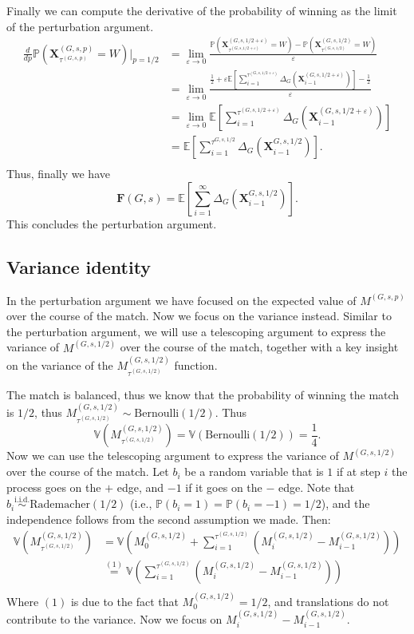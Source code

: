 \documentclass{article}
\newcommand{\var}{\mathbb{V}}
\newcommand{\win}{W}
\newcommand{\x}{\mathbf{X}}
\newcommand{\xgp}{\x^{\left(G, s, p\right)}}
\newcommand{\xge}{\x^{\left(G, s, 1/2 + \varepsilon\right)}}
\newcommand{\xghalf}{\x^{\left(G, s, 1/2\right)}}
\newcommand{\taugp}{{\tau^{\left(G, s, p\right)}}}
\newcommand{\taughalf}{{\tau^{\left(G, s, 1/2\right)}}}
\newcommand{\tauge}{{\tau^{\left(G, s, 1/2 + \varepsilon\right)}}}
\newcommand{\mgp}{\m^{\left(G, s, p\right)}}
\newcommand{\mghalf}{\m^{\left(G, s, 1/2\right)}}
\newcommand{\m}{M}
\newcommand{\ex}{\mathbb{E}}
\newcommand{\pr}{\mathbb{P}}
\newcommand{\fair}{\mathbf{F}}
\begin{document}
Finally we can compute the derivative of the probability of winning as the limit of the perturbation argument.
\begin{align*}
    \frac{d}{dp} \pr\left(\xgp_\taugp = \win\right)  \Big\vert_{p=1/2} &= \lim_{\varepsilon \to 0} \frac{\pr\left(\xge_\tauge = \win\right) - \pr\left(\xghalf_\taughalf = \win\right)}{\varepsilon} \\
    &= \lim_{\varepsilon \to 0} \frac{\frac12 + \varepsilon \ex\left[\sum_{i=1}^{\tauge} \Delta_G\left(\xge_{i-1}\right)\right] - \frac12}{\varepsilon} \\
    &= \lim_{\varepsilon \to 0} \ex\left[\sum_{i=1}^{\tauge} \Delta_G\left(\xge_{i-1}\right)\right] \\
    &= \ex\left[\sum_{i=1}^{\tau^{G, s, 1/2}} \Delta_G\left(\x^{G, s, 1/2}_{i-1}\right)\right]. \\
\end{align*}
Thus, finally we have
\begin{equation}\label{eq:fairness_formula}
    \fair(G, s) = \ex\left[\sum_{i=1}^{\infty} \Delta_G\left(\x^{G, s, 1/2}_{i-1}\right)\right].
\end{equation}
This concludes the perturbation argument. 
\subsection*{Variance identity}

In the perturbation argument we have focused on the expected value of $\mgp$ over the course of the match. Now we focus on the variance instead. Similar to the perturbation argument, we will use a telescoping argument to express the variance of $\mghalf$ over the course of the match, together with a key insight on the variance of the $\mghalf_\taughalf$ function.

The match is balanced, thus we know that the probability of winning the match is $1/2$, thus $\mghalf_\taughalf \sim \text{Bernoulli}(1/2)$. Thus
\begin{equation}\label{eq:variance_target}
    \var\left(\mghalf_\taughalf\right) = \var\left(\text{Bernoulli}(1/2)\right) =  \frac14.
\end{equation}
Now we can use the telescoping argument to express the variance of $\mghalf$ over the course of the match. Let $b_i$ be a random variable that is $1$ if at step $i$ the process goes on the $+$ edge, and $-1$ if it goes on the $-$ edge. Note that $b_i\overset{\text{i.i.d.}}{\sim} \text{Rademacher}(1/2)$ (i.e., $\pr(b_i = 1) = \pr(b_i = -1) = 1/2$), and the independence follows from the second assumption we made. Then:
\begin{align*}
    \var \left(\mghalf_\taughalf\right) &= \var\left(\mghalf_0 + \sum_{i=1}^{\taughalf} \left(\mghalf_i - \mghalf_{i-1}\right)\right) \\
    &\overset{(1)}{=}\var\left(\sum_{i=1}^{\taughalf} \left(\mghalf_i - \mghalf_{i-1}\right)\right) \\
\end{align*}
Where $(1)$ is due to the fact that $\mghalf_0 = 1/2$, and translations do not contribute to the variance. Now we focus on $\mghalf_i - \mghalf_{i-1}$.
\end{document}
